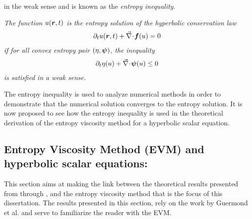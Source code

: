 %
in the weak sense and is known as the \emph{entropy inequality}. 
%
\begin{definition}
\emph{The function $u(\boldsymbol r, t)$ is the entropy solution of the hyperbolic conservation law 
%
\begin{equation}
\partial_t u( \boldsymbol r, t) + \vec{\nabla}\! \cdot \! \boldsymbol f(u) = 0 \nonumber
\end{equation}
%
if for all convex entropy pair $\left( \eta,\boldsymbol\psi \right)$, the inequality 
%
\begin{equation}
\partial_t \eta (u) + \vec{\nabla}\! \cdot \! \boldsymbol\psi (u) \leq 0 \nonumber
\end{equation}
%
is satisfied in a weak sense.}
\end{definition}
%
The entropy inequality is used to analyze numerical methods in order to demonstrate that the numerical solution converges to the entropy solution. It is now proposed to see how the entropy inequality is used in the theoretical derivation of the entropy viscosity method for a hyperbolic scalar equation. 
\subsection{Entropy Viscosity Method (EVM) and hyperbolic scalar equations:}
This section aims at making the link between the theoretical results presented from  through , and the entropy viscosity method that is the focus of this dissertation. The results presented in this section, rely on the work by Guermond et al. \cite{jlg1, jlg2, jlg3, valentin} and serve to familiarize the reader with the EVM.

